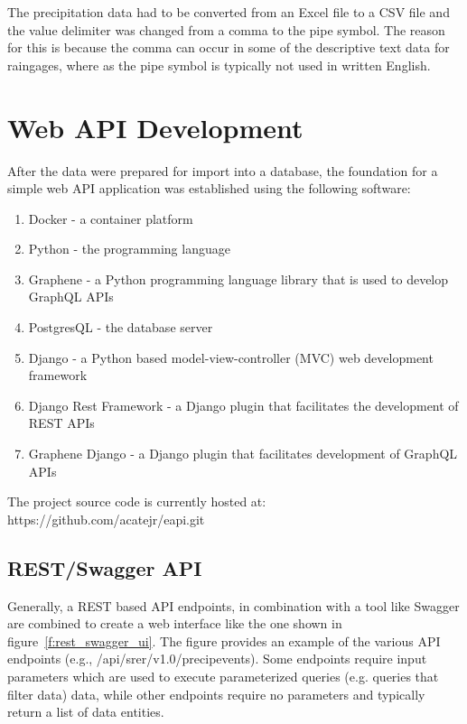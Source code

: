 The precipitation data had to be converted from an Excel file to a CSV file 
and the value delimiter was changed from a comma to the pipe symbol.  The 
reason for this is because the comma can occur in some of the descriptive text 
data for raingages, where as the pipe symbol is typically not used in written 
English.

\section{Web API Development}
After the data were prepared for import into a database, the foundation for a simple web API 
application was established using the following software:

\begin{enumerate}
  \item Docker - a container platform \cite{hid505Docker2018}
  \item Python - the programming language
  \item Graphene - a Python programming language library that is used to 
  develop GraphQL APIs
  \item PostgresQL - the database server
  \item Django - a Python based model-view-controller (MVC) web development 
  framework
  \item Django Rest Framework - a Django plugin that facilitates the 
  development of REST APIs
  \item Graphene Django - a Django plugin that facilitates development of 
  GraphQL APIs
\end{enumerate}

The project source code is currently hosted at: https://github.com/acatejr/eapi.git

\subsection{REST/Swagger API}
Generally, a REST based API endpoints, in combination with a tool like Swagger 
are combined to create a web interface like the one shown in 
figure~\ref{f:rest_swagger_ui}.  The figure provides an example of the various 
API endpoints (e.g., /api/srer/v1.0/precipevents).  Some endpoints require 
input parameters which are used to execute parameterized queries (e.g. queries 
that filter data) data, while other endpoints require no parameters and 
typically return a list of data entities.

